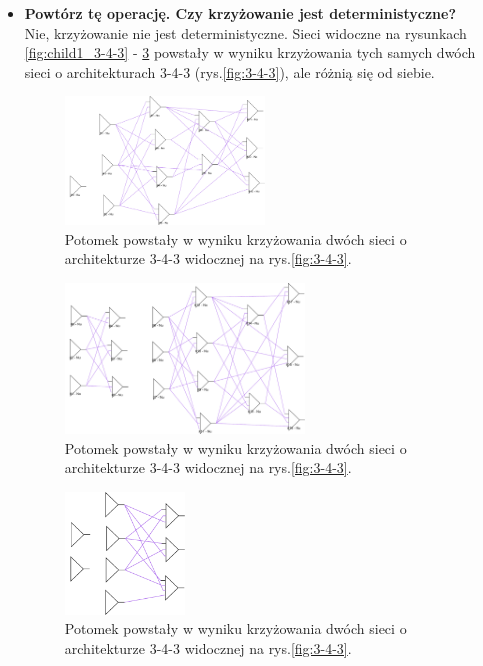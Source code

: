 \begin{enumerate}
\begin{itemize}
	
		\item\textbf{ Powtórz tę operację. Czy krzyżowanie jest deterministyczne?}
		\\Nie, krzyżowanie nie jest deterministyczne. Sieci widoczne na rysunkach \ref{fig:child1_3-4-3} - \ref{fig:child4_3-4-3} powstały w wyniku krzyżowania tych samych dwóch sieci o architekturach 3-4-3 (rys.\ref{fig:3-4-3}), ale różnią się od siebie.

		\begin{figure}[h]
		\centering
		\includegraphics[width=0.5\textwidth]{dane/part2/zad3/dziecko2_3-4-3}
		\caption{Potomek powstały w wyniku krzyżowania dwóch sieci o architekturze 3-4-3 widocznej na rys.\ref{fig:3-4-3}.\label{fig:child2_3-4-3}}
		\end{figure}
	
		\begin{figure}[h]
		\centering
		\includegraphics[width=0.6\textwidth]{dane/part2/zad3/dziecko3_3-4-3}
		\caption{Potomek powstały w wyniku krzyżowania dwóch sieci o architekturze 3-4-3 widocznej na rys.\ref{fig:3-4-3}.\label{fig:child3_3-4-3}}
		\end{figure}

		\begin{figure}[h]
		\centering
		\includegraphics[width=0.3\textwidth]{dane/part2/zad3/dziecko4_3-4-3}
		\caption{Potomek powstały w wyniku krzyżowania dwóch sieci o architekturze 3-4-3 widocznej na rys.\ref{fig:3-4-3}.\label{fig:child4_3-4-3}}
		\end{figure}	
	

\end{itemize}
\end{enumerate}
